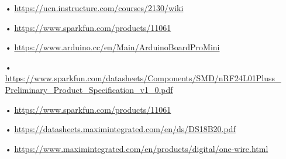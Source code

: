 \begin{enumerate}
	\item[•] \url{https://ucn.instructure.com/courses/2130/wiki}
	\item[•] \url{https://www.sparkfun.com/products/11061}
	\item[•] \url{https://www.arduino.cc/en/Main/ArduinoBoardProMini}
	\item[•] \url{https://www.sparkfun.com/datasheets/Components/SMD/nRF24L01Pluss_Preliminary_Product_Specification_v1_0.pdf}
	\item[•] \url{https://www.sparkfun.com/products/11061}
	\item[•] \url{https://datasheets.maximintegrated.com/en/ds/DS18B20.pdf}
	\item[•]\url {https://www.maximintegrated.com/en/products/digital/one-wire.html}
\end{enumerate}



